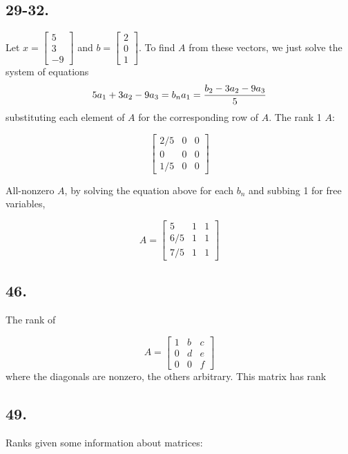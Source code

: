 \documentclass[]{article}
\begin{document}
\hypertarget{section-19}{%
\subsection{29-32.}\label{section-19}}

Let \(x=\begin{bmatrix}5\\3\\-9\end{bmatrix}\) and
\(b=\begin{bmatrix}2\\0\\1\end{bmatrix}\). To find \(A\) from these
vectors, we just solve the system of equations \[5a_1+3a_2-9a_3=b_n\\
a_1=\frac{b_2-3a_2-9a_3}{5}\] substituting each element of \(A\) for the
corresponding row of \(A\). The rank 1 \(A\):

\[\begin{bmatrix}2/5&0&0\\
0&0&0\\
1/5&0&0\end{bmatrix}\]

All-nonzero \(A\), by solving the equation above for each \(b_n\) and
subbing 1 for free variables,

\[A=\begin{bmatrix}5&1&1\\
6/5&1&1\\
7/5&1&1\end{bmatrix}\]

\hypertarget{section-20}{%
\subsection{46.}\label{section-20}}

The rank of

\[A=\begin{bmatrix}1&b&c\\
0&d&e\\
0&0&f\end{bmatrix}\] where the diagonals are nonzero, the others
arbitrary. This matrix has rank

\hypertarget{section-21}{%
\subsection{49.}\label{section-21}}

Ranks given some information about matrices:
\end{document}
